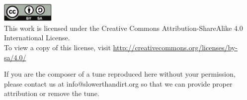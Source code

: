 \begin{titlepage}
\begin{center}
\begin{minipage}{6in}
\end{minipage}

\vfill


\includegraphics[width=1in]{../includes/cc-by-sa}\\
This work is licensed under the Creative Commons
Attribution-ShareAlike 4.0 International License.\\
To view a copy of this license, visit 
\url{http://creativecommons.org/licenses/by-sa/4.0/}

\end{center}
\end{titlepage}

\clearpage



\vfill

\noindent
If you are the composer of a tune reproduced here without your permission,
please contact us at info@slowerthandirt.org so that we can provide proper
attribution or remove the tune.

\cleardoublepage
